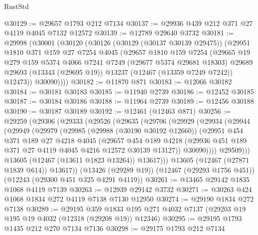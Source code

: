 \begin{lexlean}{RustStd}
\begin{coremodule}
@30129 := @29657 @1793 @212 @7134
@30137 := @29936 @439 @212 @371 @27 @4119 @4045 @7132 @12572
@30139 := @12789 @29640 @3732
@30181 := @29998
    (@30001
      (@30120
        (@30126
          (@30129 (@30137 @30139 @29475))
          (@29951
            @1810
            @371
            @159
            @27
            @7254
            @4045
            (@29657
              @1810
              @159
              @7254
              (@29665
                @19
                @279
                @159
                @5374
                @4066
                @7241
                @7249
                (@29677 @5374 @29681 @18303)
                @29689
                @29693
                (@13343 (@29695 @19))
                @13237
                (@12467 (@13359 @7249 @7242))
                @12473))
            @30090))))
@30182 := @11870 @871
@30183 := @12066 @30182
@30184 := @30181 @30183
@30185 := @11940 @2739
@30186 := @12452 @30185
@30187 := @30184 @30186
@30188 := @11964 @2739
@30189 := @12456 @30188
@30190 := @30187 @30189
@30192 := @12461 (@12463 @871)
@30256 := @29259
    (@29306
      (@29333
        (@29526
          (@29635
            (@29706
              (@29929
                (@29934
                  (@29944
                    (@29949
                      (@29979
                        (@29985
                          (@29988 (@30190 @30192 @12660))
                          (@29951
                            @454
                            @371
                            @189
                            @27
                            @4218
                            @4045
                            (@29657
                              @454
                              @189
                              @4218
                              (@29936 @451 @189 @371 @27 @4119 @4045 @4216 @12572 @30139 @13127))
                            @30090))))
                    @29509)))
              @13605
              (@12467 (@13611 @1823 @13264))
              @13617)))
        @13605
        (@12467 (@27871 @1839 @614))
        @13617))
    (@13426 (@29289 @19))
    (@12467 (@29293 @1756 @451))
    (@12243 (@29300 @451 @325 @4291 @4119))
@30261 := @13465 @29142 @1835 @1068 @4119 @7139
@30263 := @12939 @29142 @3732
@30271 := @30263 @424 @1068 @1834 @272 @4119 @7138 @7130 @12950
@30274 := @29190 @1834 @272 @7138
@30289 := @29195
    @359
    @1833
    @195
    @271
    @4032
    @7137
    (@29203 @19 @195 @19 @4032 (@12318 (@29208 @19)) @12346)
@30295 := @29195 @1793 @1435 @212 @270 @7134 @7136
@30298 := @29175 @1793 @212 @7134

\end{coremodule}
\end{lexlean}
